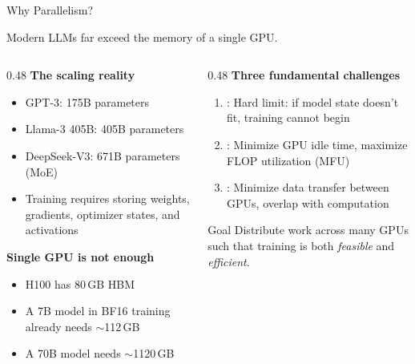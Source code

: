 
\begin{frame}{Why Parallelism?}

  Modern LLMs far exceed the memory of a single GPU.

  \vspace{0.5em}
  \begin{columns}
    \begin{column}{0.48\textwidth}
      \textbf{The scaling reality}
      \begin{itemize}
        \item GPT-3: 175B parameters
        \item Llama-3 405B: 405B parameters
        \item DeepSeek-V3: 671B parameters (MoE)
        \item Training requires storing weights, gradients, optimizer states, and activations
      \end{itemize}

      \vspace{0.5em}
      \textbf{Single GPU is not enough}
      \begin{itemize}
        \item H100 has 80\,GB HBM
        \item A 7B model in BF16 training already needs $\sim$112\,GB
        \item A 70B model needs $\sim$1120\,GB
      \end{itemize}
    \end{column}
    \begin{column}{0.48\textwidth}
      \textbf{Three fundamental challenges}~\cite{tazi2025ultrascale}
      \begin{enumerate}
        \item {}: Hard limit: if model state doesn't fit, training cannot begin
        \item {}: Minimize GPU idle time, maximize FLOP utilization (MFU)
        \item {}: Minimize data transfer between GPUs, overlap with computation
      \end{enumerate}

      \vspace{0.5em}
      \begin{alertblock}{Goal}
        Distribute work across many GPUs such that training is both \emph{feasible} and \emph{efficient}.
      \end{alertblock}
    \end{column}
  \end{columns}
\end{frame}

